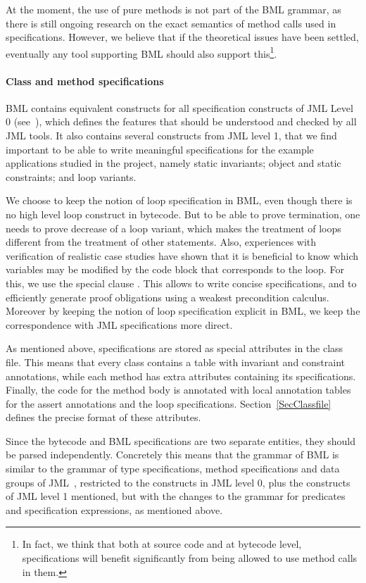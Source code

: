 At the moment, the use of pure methods is not part of the BML grammar,
as there is still ongoing research on the exact semantics of method
calls used in specifications. However, we believe that if the
theoretical issues have been settled, eventually any tool supporting
BML should also support this\footnote{In fact, we think that both at
source code and at bytecode level, specifications will benefit
significantly from being allowed to use method calls in them.}.


\paragraph{Class and method specifications}
BML contains equivalent constructs for all specification constructs of
JML Level 0 (see~\cite[\S2.9]{JMLReferenceManual05}), which defines
the features that should be understood and checked by all JML
tools. It also contains several constructs from JML level 1,
that we find important to be able to write meaningful specifications
for the example applications studied in the \mobius project, namely
static invariants; object and static constraints; and loop variants.

We choose to keep the notion of loop specification in BML, even though
there is no high level loop construct in bytecode. But to be able to
prove termination, one needs to prove decrease of a loop variant,
which makes the treatment of loops different from the treatment of
other statements. Also, experiences with verification of realistic
case studies have shown that it is beneficial to know which variables
may be modified by the code block that corresponds to the loop. For
this, we use the special clause . This
allows to write concise specifications, and to efficiently generate
proof obligations using a weakest precondition calculus.  Moreover by
keeping the notion of loop specification explicit in BML, we keep the
correspondence with JML specifications more direct.


As mentioned above, specifications are stored as special attributes in
the class file. This means that every class contains a table with
invariant and constraint annotations, while each method has extra
attributes containing its specifications. Finally, the code for the
method body is annotated with local annotation tables for the assert
annotations and the loop specifications. Section~\ref{SecClassfile}
defines the precise format of these attributes.


Since the bytecode and BML specifications are two separate entities,
they should be parsed independently. Concretely this means that the
grammar of BML is similar to the grammar of type specifications,
method specifications and data groups of JML~\cite[\S A.5, A.6,
A.7]{JMLReferenceManual05}, restricted to the constructs in JML level
0, plus the constructs of JML level 1 mentioned, but with the changes
to the grammar for predicates and specification expressions, as
mentioned above. 


